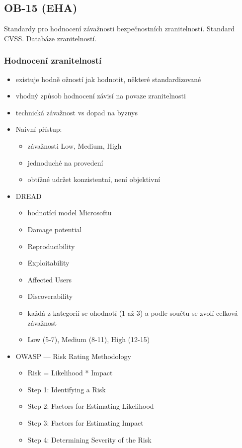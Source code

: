 \subsection{OB-15 (EHA)}
Standardy pro hodnocení závažnosti bezpečnostních zranitelností. Standard CVSS. Databáze zranitelností.

\subsubsection*{Hodnocení zranitelností}
\begin{itemize}
	\item existuje hodně ožností jak hodnotit, některé standardizované
	\item vhodný způsob hodnocení závisí na povaze zranitelnosti
	\item technická závažnost vs dopad na byznys
	\item Naivní přístup:
	\begin{itemize}
		\item závažnosti Low, Medium, High
		\item jednoduché na provedení
		\item obtížné udržet konzistentní, není objektivní
	\end{itemize}
	\item DREAD
	\begin{itemize}
		\item hodnotící model Microsoftu
		\item Damage potential
		\item Reproducibility
		\item Exploitability
		\item Affected Users
		\item Discoverability
		\item každá z kategorií se ohodnotí (1 až 3) a podle součtu se zvolí celková závažnost
		\item Low (5-7), Medium (8-11), High (12-15)
	\end{itemize}
	\item  OWASP --- Risk Rating Methodology
	\begin{itemize}
		\item Risk = Likelihood * Impact
		\item Step 1: Identifying a Risk
		\item Step 2: Factors for Estimating Likelihood
		\item Step 3: Factors for Estimating Impact
		\item Step 4: Determining Severity of the Risk

\end{itemize}
\end{itemize}
